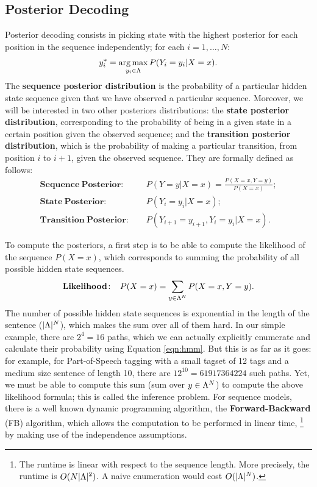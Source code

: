 \subsection{Posterior Decoding}\label{posterior}
Posterior decoding consists
in picking state with the highest posterior for each position in the sequence independently; for 
each $i = 1,\ldots,N$:
\begin{equation}
y_i^* = \operatorname*{arg\,max}_{y_i \in \Lambda} P(Y_i=y_i | X = x).
\end{equation}
The \textbf{sequence posterior distribution} is the probability of a particular
hidden state sequence given that we have observed a particular
sequence. Moreover, we will be interested in two other posteriors distributions:
the \textbf{state posterior distribution}, corresponding to the
probability of being in a given state in a certain position given the
observed sequence; and the \textbf{transition posterior distribution},
which is the probability of making a particular transition, from position $i$ to
$i+1$, given the observed sequence. They are formally defined as follows:
\begin{align}
  \mathbf{Sequence \ Posterior\!:}\;\;\;\; &P(Y=y|X=x) = \frac{P(X=x,Y=y)}{P(X=x)}; \label{eq::posteriorDistribution} \\
 \mathbf{State \ Posterior\!:}\;\;\;\;  & P(Y_i=y_i | X=x); \label{eq::nodePosterior} \\
 \mathbf{Transition \ Posterior\!:}\;\;\;\;  &P(Y_{i+1}=y_{i+1},Y_i=y_i| X=x).\label{eq::edgePosterior}
\end{align}

To compute the posteriors, a first step is to be able to compute the 
likelihood of
the sequence $P(X=x)$, which corresponds to summing the probability of all
possible hidden state sequences.
\begin{equation}
\label{likelihoood}
\mathbf{Likelihood\!:}\;\;\;\; P(X=x) = \displaystyle \sum_{y \in \Lambda^N} P(X=x,Y=y).
\end{equation}
The number of possible hidden state sequences is exponential in the
length of the sentence ($|\Lambda|^N$),
 which makes the sum over all of them hard. 
 In our simple
 example, there are $2^4 = 16$ paths, which we can actually explicitly enumerate
 and calculate their probability using Equation \ref{eqn:hmm}. But this is as far as it goes: for example, for Part-of-Speech
 tagging with a small tagset of 12 tags and a medium size
 sentence of length 10, there are $12^{10} = 61 917 364 224$ such
 paths. 
Yet, we must be able to compute this sum (sum over $y \in \Lambda^N$) to compute the above likelihood
formula; this is called the inference problem. For sequence models, there is a well known dynamic programming algorithm,
the \textbf{Forward-Backward} (FB) algorithm, which allows the computation
to be performed in linear time,%
\footnote{The runtime is linear with respect
to the sequence length. More precisely, 
the runtime is $O(N|\Lambda|^2)$. 
A naive enumeration would cost $O(|\Lambda|^N)$.} %
by making use of the independence assumptions.

